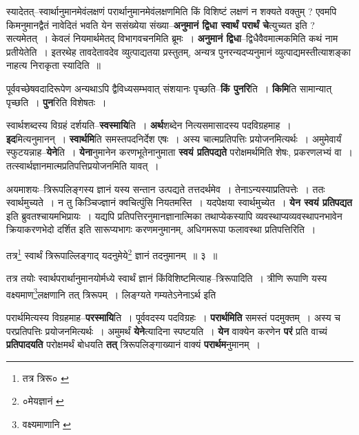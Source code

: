 \documentclass[article,12pt,a4paper]{memoir}
\begin{document}
	  \pstart स्यादेतत्--स्वार्थानुमानमेवंलक्षणं परार्थानुमानमेवंलक्षणमिति किं विशिष्टं लक्षणं न शक्यते वक्तुम् ? एवमपि किमनुमानद्वैतं नावेदितं भवति येन ससंख्येया संख्या--\textbf{अनुमानं द्विधा स्वार्थं परार्थं चे}त्युच्यत इति ? सत्यमेतत् । केवलं नियमार्थमेतद् विभागवचनमिति ब्रूमः । \textbf{अनुमानं द्विधा}--द्विधैवैवमात्मकमिति कथं नाम \leavevmode{} प्रतीयेतेति । इतरथेह तावदेतावदेव व्युत्पाद्यतया प्रस्तुतम्, अन्यत्र पुनरन्यदप्यनुमानं व्युत्पाद्यमस्तीत्याशङ्का नाहत्य निराकृता स्यादिति ॥
	\pend
      

	  \pstart पूर्ववच्छेषवदादिरूपेण अन्यथाऽपि द्वैविध्यसम्भवात् संशयानः पृच्छति--\textbf{किं पुनरि}ति । \textbf{किमि}ति सामान्यात् पृच्छति । \textbf{पुन}रिति विशेषतः ।
	\pend
      

	  \pstart स्वार्थशब्दस्य विग्रहं दर्शयति--\textbf{स्वस्मायि}ति । \textbf{अर्थ}शब्देन नित्यसमासादस्य पदविग्रहमाह । \textbf{इद}मित्यनुमानन् । \textbf{स्वार्थमि}ति समस्तपदनिर्देश एषः । अस्य चात्मप्रतिपत्तिः प्रयोजनमित्यर्थः । अमुमेवार्यं स्फुटयन्नाह--\textbf{येने}ति । \textbf{येना}नुमानेन करणभूतेनानुमाता \textbf{स्वयं प्रतिपद्यते} परोक्षमर्थमिति शेषः, प्रकरणलभ्यं वा । तत्स्वार्थज्ञानमात्मप्रतिपत्तिप्रयोजनमिति यावत् ।
	\pend
      

	  \pstart अयमाशयः--त्रिरूपलिङ्गस्य ज्ञानं यस्य सन्तान उत्पद्यते तत्तदर्थमेव । तेनाऽन्यस्याप्रतिपत्तेः । ततः स्वार्थमुच्यते । न तु किञ्चिज्ज्ञानं क्वचित्पुंसि नियतमस्ति । यदपेक्षया स्वार्थमुच्येत । \textbf{येन स्वयं प्रतिपद्यत} इति ब्रुवतश्चायमभिप्रायः । यद्यपि प्रतिपत्तिरनुमानज्ञानात्मिका तथाप्येकस्यापि व्यवस्थाप्यव्यवस्थापनभावेन क्रियाकरणभेदो दर्शित इति सारूप्यभागः करणमनुमानम्, अधिगमरूपा फलावस्था प्रतिपत्तिरिति ।
	\pend
	  \bigskip
	  \begingroup
	

	  \pstart तत्र\footnote{तत्र त्रिरू० \cite{dp-edE}} स्वार्थं त्रिरूपाल्लिङ्गाद् यदनुमेये\footnote{०मेयज्ञानं \cite{dp-msC}} ज्ञानं तदनुमानम् ॥ ३ ॥
	\pend
      
	  \endgroup
	
	  \bigskip
	  \begingroup
	

	  \pstart तत्र तयोः स्वार्थपरार्थानुमानयोर्मध्ये स्वार्थं ज्ञानं किंविशिष्टमित्याह--त्रिरूपादिति । त्रीणि रूपाणि यस्य वक्ष्यमाण\footnote{वक्ष्यमाणानि \cite{dp-msD}}\-लक्षणानि तत् त्रिरूपम् । लिङ्ग्यते गम्यतेऽनेनाऽर्थ इति
	\pend
      
	  \endgroup
	

	  \pstart परार्थमित्यस्य विग्रहमाह--\textbf{परस्मायि}ति । पूर्ववदस्य पदविग्रहः । \textbf{परार्थमिति} समस्तं पदमुक्तम् । अस्य च परप्रतिपत्तिः प्रयोजनमित्यर्थः । अमुमर्थं \textbf{येने}त्यादिना स्पष्टयति । \textbf{येन} वाक्येन करणेन \textbf{परं} प्रति वाच्यं \textbf{प्रतिपादयति} परोक्षमर्थं बोधयति \textbf{तत्} त्रिरूपलिङ्गाख्यानं वाक्यं \textbf{परार्थम}नुमानम् ।
	\pend
      
\end{document}
